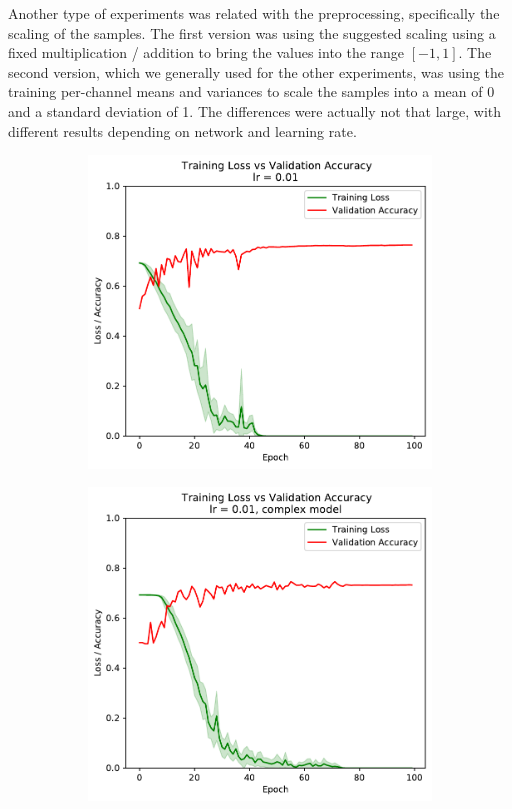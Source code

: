 \documentclass[sigconf,nonacm]{acmart}
\begin{document}
Another type of experiments was related with the
preprocessing, specifically the scaling of the
samples.
The first version was using the suggested scaling 
using a fixed multiplication / addition to bring the
values into the range $[-1,1]$.
The second version, which we generally used for the
other experiments, was using the training
per-channel means and variances to scale the samples
into a mean of 0 and a standard deviation of 1.
The differences were actually not that large,
with different results depending on network and
learning rate.

\begin{figure}[ht]
\begin{subfigure}[c]{0.45\columnwidth}
\includegraphics[width=\textwidth]{plot_0_01.pdf}
\end{subfigure}
\hspace{2pt}
\begin{subfigure}[c]{0.45\columnwidth}
\includegraphics[width=\textwidth]{plot_complex_0_01.pdf}

\end{subfigure}
\end{figure}
\end{document}
